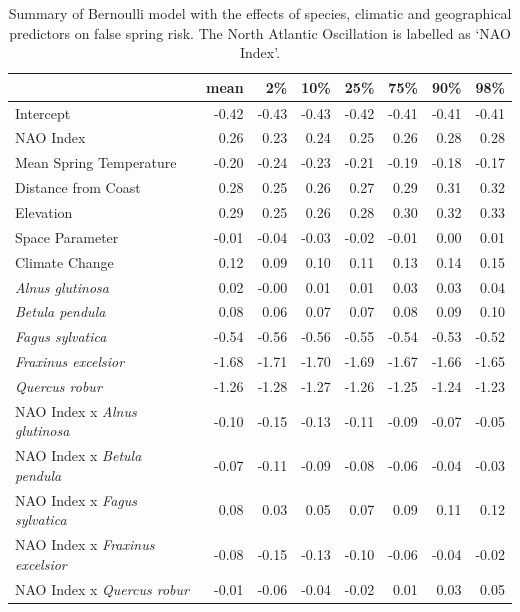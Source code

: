 \documentclass{article}\usepackage[]{graphicx}\usepackage[]{color}
\begin{document}
\newpage
\begin{longtable}{lrrrrrrr}
\caption{Summary of Bernoulli model with the effects of species, climatic and geographical predictors on false spring risk. The North Atlantic Oscillation is labelled as `NAO Index'. } \\ 
  \hline
 & mean & 2\% & 10\% & 25\% & 75\% & 90\% & 98\% \\ 
  \hline \endhead  \hline
Intercept & -0.42 & -0.43 & -0.43 & -0.42 & -0.41 & -0.41 & -0.41 \\ 
  NAO Index & 0.26 & 0.23 & 0.24 & 0.25 & 0.26 & 0.28 & 0.28 \\ 
  Mean Spring 
Temperature & -0.20 & -0.24 & -0.23 & -0.21 & -0.19 & -0.18 & -0.17 \\ 
  Distance from 
Coast & 0.28 & 0.25 & 0.26 & 0.27 & 0.29 & 0.31 & 0.32 \\ 
  Elevation & 0.29 & 0.25 & 0.26 & 0.28 & 0.30 & 0.32 & 0.33 \\ 
  Space Parameter & -0.01 & -0.04 & -0.03 & -0.02 & -0.01 & 0.00 & 0.01 \\ 
  Climate Change & 0.12 & 0.09 & 0.10 & 0.11 & 0.13 & 0.14 & 0.15 \\ 
  \textit{Alnus glutinosa} & 0.02 & -0.00 & 0.01 & 0.01 & 0.03 & 0.03 & 0.04 \\ 
  \textit{Betula pendula} & 0.08 & 0.06 & 0.07 & 0.07 & 0.08 & 0.09 & 0.10 \\ 
  \textit{Fagus sylvatica} & -0.54 & -0.56 & -0.56 & -0.55 & -0.54 & -0.53 & -0.52 \\ 
  \textit{Fraxinus excelsior} & -1.68 & -1.71 & -1.70 & -1.69 & -1.67 & -1.66 & -1.65 \\ 
  \textit{Quercus robur} & -1.26 & -1.28 & -1.27 & -1.26 & -1.25 & -1.24 & -1.23 \\ 
  NAO Index
x\textit{ Alnus glutinosa} & -0.10 & -0.15 & -0.13 & -0.11 & -0.09 & -0.07 & -0.05 \\ 
  NAO Index
x\textit{ Betula pendula} & -0.07 & -0.11 & -0.09 & -0.08 & -0.06 & -0.04 & -0.03 \\ 
  NAO Index
x\textit{ Fagus sylvatica} & 0.08 & 0.03 & 0.05 & 0.07 & 0.09 & 0.11 & 0.12 \\ 
  NAO Index
x\textit{ Fraxinus excelsior} & -0.08 & -0.15 & -0.13 & -0.10 & -0.06 & -0.04 & -0.02 \\ 
  NAO Index
x\textit{ Quercus robur} & -0.01 & -0.06 & -0.04 & -0.02 & 0.01 & 0.03 & 0.05 \\ 

\end{longtable}
\end{document}
